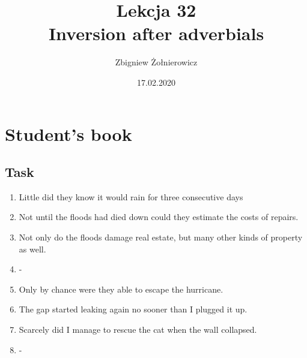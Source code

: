 \documentclass[a4paper]{article}
\begin{document}
\title{{\huge Lekcja 32} \\
{\large Inversion after adverbials}}
\author{Zbigniew Żołnierowicz}
\date{17.02.2020}
\maketitle
\section{Student's book}
\subsection{Task}
\begin{enumerate}
    \item Little did they know it would rain for three consecutive days
    \item Not until the floods had died down could they estimate the costs of repairs.
    \item Not only do the floods damage real estate, but many other kinds of property as well.
    \item -
    \item Only by chance were they able to escape the hurricane.
    \item The gap started leaking again no sooner than I plugged it up.
    \item Scarcely did I manage to rescue the cat when the wall collapsed.
    \item -
\end{enumerate}
\end{document}
